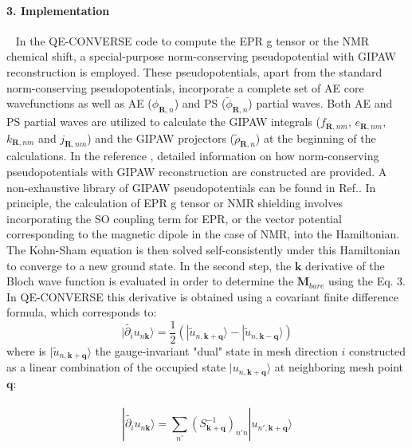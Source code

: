 \documentclass[final,3p,times,twocolumn]{elsarticle}
\begin{document}
\begin{small}
\paragraph{3. Implementation} \
\vskip0.5cm
\noindent
In the {\selectfont
QE-CONVERSE} code to compute the EPR g tensor or the NMR chemical shift, a special-purpose norm-conserving pseudopotential with GIPAW reconstruction is employed. These pseudopotentials, apart from the standard norm-conserving pseudopotentials, incorporate a complete set of AE core wavefunctions as well as AE ($\phi_{\mathbf{R},n}$) and PS ($\widetilde{\phi}_{\mathbf{R},n}$) partial waves. Both AE and PS partial waves are utilized to calculate the GIPAW integrals (${f}_{\mathbf{R},nm}$, ${e}_{\mathbf{R},nm}$, ${k}_{\mathbf{R},nm}$ and ${j}_{\mathbf{R},nm}$) and the GIPAW projectors ($\widetilde{\rho}_{\mathbf{R},n}$) at the beginning of the calculations. In the reference \cite{PhysRevB.81.184424}, detailed information on how norm-conserving pseudopotentials with GIPAW reconstruction are constructed are provided. A non-exhaustive library of GIPAW pseudopotentials can be found in Ref.\cite{pseudoGIPAW}.
In principle, the calculation of EPR g tensor or NMR shielding involves incorporating the SO coupling term for EPR, or the vector potential corresponding to the magnetic dipole in the case of NMR, into the Hamiltonian. The Kohn-Sham equation is then solved self-consistently under this Hamiltonian to converge to a new ground state. In the second step, the $\mathbf{k}$ derivative of the Bloch wave function is evaluated in order to determine the $\mathbf{M}_{bare}$ using the Eq. 3. In  {\fontfamily{qcr}\selectfont QE-CONVERSE} this derivative is obtained using a covariant finite difference formula, which corresponds to:
\begin{equation}
|\widetilde{\partial _{i}}u_{n \mathbf{k}}\rangle=\frac{1}{2}\left ( |\widetilde u_{n, \mathbf{k+q}}\rangle - |\widetilde u_{n, \mathbf{k-q}}\rangle  \right )    
\end{equation}
where is $|\widetilde u_{n, \mathbf{k+q}}\rangle$ the gauge-invariant "dual" state in mesh direction $i$ constructed as a linear combination of the occupied state $|u_{n, \mathbf{k+q}}\rangle$ at neighboring mesh point $\mathbf{q}$: \\ \\
\begin{equation}
|\widetilde{\partial _{i}}u_{n \mathbf{k}}\rangle=\sum_{n'}^{}\left ( S_{\mathbf{k+q}}^{-1} \right )_{n'n} | u_{n', \mathbf{k+q}}\rangle    
\end{equation}

\end{small}
\end{document}
